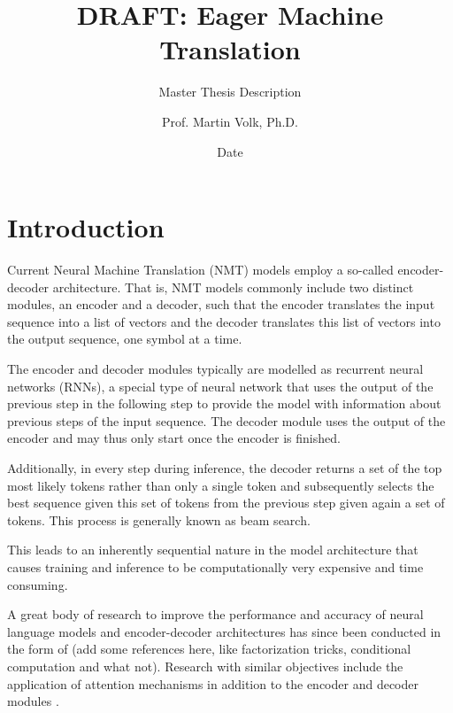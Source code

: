 \documentclass[english]{uzhpub}
\begin{document}
\title{DRAFT: Eager Machine Translation}

\subtitle{Master Thesis Description}

\author{Prof. Martin Volk, Ph.D.}

\date{Date}

\maketitle


\section{Introduction}

Current Neural Machine Translation (NMT) models employ a so-called encoder-decoder architecture. That is, NMT models commonly include two distinct modules, an encoder and a decoder, such that the encoder translates the input sequence into a list of vectors and the decoder translates this list of vectors into the output sequence, one symbol at a time.

The encoder and decoder modules typically are modelled as recurrent neural networks (RNNs), a special type of neural network that uses the output of the previous step in the following step to provide the model with information about previous steps of the input sequence. The decoder module uses the output of the encoder and may thus only start once the encoder is finished.

Additionally, in every step during inference, the decoder returns a set of the top most likely tokens rather than only a single token and subsequently selects the best sequence given this set of tokens from the previous step given again a set of tokens.
This process is generally known as beam search.

This leads to an inherently sequential nature in the model architecture that causes training and inference to be computationally very expensive and time consuming. \cite{chung2014empirical,seq2seq.sutskever2014sequence,google.wu2016google,cho2014learning,jointly.bahdanau2014neural,effective.luong2015effective}

A great body of research to improve the performance and accuracy of neural language models and encoder-decoder architectures has since been conducted in the form of (add some references here, like factorization tricks, conditional computation and what not).
Research with similar objectives include the application of attention mechanisms in addition to the encoder and decoder modules \cite{jointly.bahdanau2014neural,effective.luong2015effective,attentionisallyouneed}.
\end{document}
